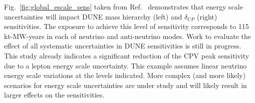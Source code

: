  Fig.~\ref{fig:global_escale_sens} taken from Ref.~\cite{dunecdr} demonstrates that
energy scale uncertainties will impact DUNE 
mass hierarchy (left) and $\delta_{CP}$ (right) sensitivities.
The exposure to achieve this level of sensitivity corresponds to 
115 kt-MW-years in each of neutrino and anti-neutrino modes.
Work to evaluate the effect of all systematic uncertainties in DUNE sensitivities is still in progress.
This study already indicates a significant reduction of the CPV peak sensitivity due to a lepton energy scale uncertainty. 
This example assumes linear neutrino energy scale variations at the levels indicated.
More complex (and more likely) scenarios for energy scale uncertainties are under study and
will likely result in larger effects on the sensitivities.
